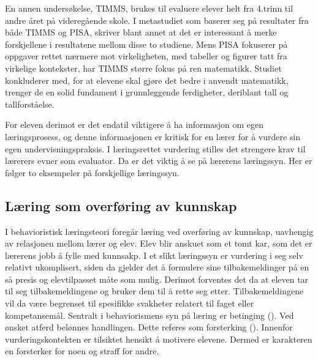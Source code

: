 \documentclass[main.tex]{subfiles}
\begin{document}
En annen undersøkelse, TIMMS, brukes til evaluere elever helt fra 4.trinn
til andre året på videregående skole. I metastudiet som baserer seg på resultater fra både TIMMS og PISA, 
 skriver blant annet at det er interessant å merke forskjellene i resultatene mellom disse to 
studiene. Mens PISA fokuserer på oppgaver rettet nærmere mot virkeligheten, med tabeller og figurer tatt fra virkelige
kontekster, har TIMMS større fokus på ren matematikk. Studiet konkluderer med, for at elevene skal gjøre det bedre
i anvendt matematikk, trenger de en solid fundament i grunnleggende ferdigheter, deriblant tall og tallforståelse.

For eleven derimot er det endatil viktigere å ha informasjon om egen læringsprosess, og denne informasjonen er kritisk 
for en lærer for å vurdere sin egen undervisningspraksis. I læringsrettet vurdering stilles det strengere krav til 
lærerers evner som evaluator. Da er det viktig å se på lærerens læringssyn. Her er følger to eksempeler på 
forskjellige læringssyn.

\subsection*{Læring som overføring av kunnskap}

I behavioristisk læringsteori foregår læring ved overføring av kunnskap, uavhengig av relasjonen mellom lærer 
og elev. Elev blir anskuet som et tomt kar, som det er lærerens jobb å fylle med kunnsakp. 
I et slikt læringssyn er vurdering i seg selv relativt ukomplisert, siden da gjelder det å 
formulere sine tilbakemeldinger på en så presis og elevtilpasset måte som mulig.
Derimot forventes det da at eleven tar til seg tilbakemeldingene og bruker dem til å rette seg etter.
Tilbakemeldingene vil da være begrenset til spesifikke svakheter relatert til faget eller kompetansemål.
Sentralt i behaviorismens syn på læring er betinging (). Ved ønsket atferd belønnes 
handlingen. Dette referes som forsterking (). Innenfor vurderingskontekten er
tilsiktet hensikt å motivere elevene. Dermed er karakteren en forsterker for noen og straff for andre.
\newline
\end{document}
